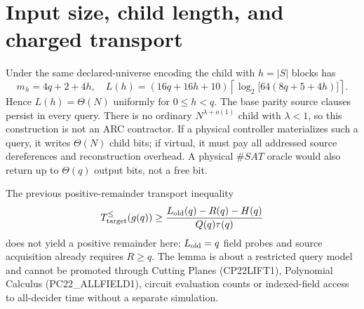 \documentclass[11pt]{article}
\begin{document}
\section{Input size, child length, and charged transport}
Under the same declared-universe encoding the child with $h=|S|$ blocks has
\[
m_h=4q+2+4h,\quad
L(h)=(16q+16h+10)
\left\lceil\log_2\bigl[64(8q+5+4h)\bigr]\right\rceil.
\]
Hence $L(h)=\Theta(N)$ uniformly for $0\le h<q$. The base parity source clauses persist in every query. There is no ordinary $N^{\lambda+o(1)}$ child with $\lambda<1$, so this construction is not an ARC contractor. If a physical controller materializes such a query, it writes $\Theta(N)$ child bits; if virtual, it must pay all addressed source dereferences and reconstruction overhead. A physical $\#SAT$ oracle would also return up to $\Theta(q)$ output bits, not a free bit.

The previous positive-remainder transport inequality
\[
T_{\rm target}^{\le}(g(q))\ge
\frac{L_{\rm old}(q)-R(q)-H(q)}{Q(q)\tau(q)}
\]
does not yield a positive remainder here: $L_{\rm old}=q$ field probes and source acquisition already requires $R\ge q$. The lemma is about a restricted query model and cannot be promoted through Cutting Planes (CP22LIFT1), Polynomial Calculus (PC22\_ALLFIELD1), circuit evaluation counts or indexed-field access to all-decider time without a separate simulation.
\end{document}
